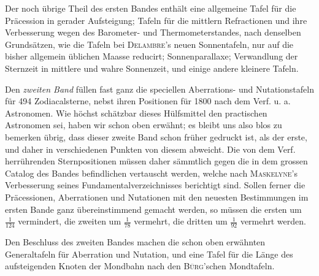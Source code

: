 Der noch übrige Theil des ersten Bandes enthält eine allgemeine Tafel für die Präcession in gerader Aufsteigung; Tafeln für die mittlern Refractionen und ihre Verbesserung wegen des Barometer- und Thermometerstandes, nach denselben Grundsätzen, wie die Tafeln bei \textsc{Delambre}'s neuen Sonnentafeln, nur auf die bisher allgemein üblichen Maasse reducirt; Sonnenparallaxe; Verwandlung der Sternzeit in mittlere und wahre Sonnenzeit, und einige andere kleinere Tafeln.

Den \emph{zweiten Band} füllen fast ganz die speciellen Aberrations- und Nutationstafeln für 494 Zodiacalsterne, nebst ihren Positionen für 1800 nach dem Verf. u. a. Astronomen. Wie höchst schätzbar dieses Hülfsmittel den practischen Astronomen sei, haben wir schon oben erwähnt; es bleibt uns also blos zu bemerken übrig, dass dieser zweite Band schon früher gedruckt ist, als der erste, und daher in verschiedenen Punkten von diesem abweicht. Die von dem Verf. herrührenden Sternpositionen müssen daher sämmtlich gegen die in dem grossen Catalog des Bandes befindlichen vertauscht werden, welche nach \textsc{Maskelyne}'s Verbesserung seines Fundamentalverzeichnisses berichtigt sind. Sollen ferner die Präcessionen, Aberrationen und Nutationen mit den neuesten Bestimmungen im ersten Bande ganz übereinstimmend gemacht werden, so müssen die ersten um $\frac{1}{124}$ vermindert, die zweiten um $\frac{1}{78}$ vermehrt, die dritten um $\frac{1}{92}$ vermehrt werden.

Den Beschluss des zweiten Bandes machen die schon oben erwähnten Generaltafeln für Aberration und Nutation, und eine Tafel für die Länge des aufsteigenden Knoten der Mondbahn nach den \textsc{Bürg}'schen Mondtafeln.
